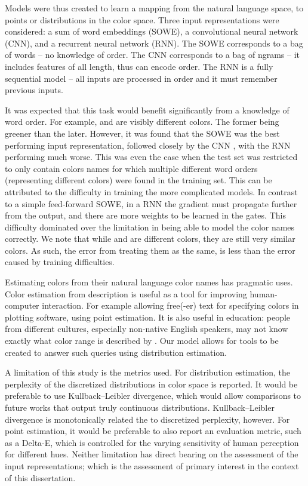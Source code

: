 \documentclass{book}
\begin{document}
Models were thus created to learn a mapping from the natural language space, to points or distributions in the color space.
Three input representations were considered: a sum of word embeddings (SOWE), a convolutional neural network (CNN), and a recurrent neural network (RNN).
The SOWE corresponds to a bag of words -- no knowledge of order.
The CNN corresponds to a bag of ngrams -- it includes features of all length, thus can encode order.
The RNN is a fully sequential model -- all inputs are processed in order and it must remember previous inputs.

It was expected that this task would benefit significantly from a knowledge of word order.
For example,  and  are visibly different colors.
The former being greener than the later.
However, it was found that the SOWE was the best performing input representation, 
followed closely by the CNN , with the RNN performing much worse.
This was even the case when the test set was restricted to only contain colors names for which multiple different word orders (representing different colors) were found in the training set.
This can be attributed to the difficulty in training the more complicated models.
In contrast to a simple feed-forward SOWE, in a RNN the gradient must propagate further from the output,
and there are more weights to be learned in the gates.
This difficulty dominated over the limitation in being able to model the color names correctly.
We note that while  and  are different colors, they are still very similar colors.
As such, the error from treating them as the same, is less than the error caused by training difficulties.


Estimating colors from their natural language color names has pragmatic uses.
Color estimation from description is useful as a tool for improving human-computer interaction.
For example allowing free(-er) text for specifying colors in plotting software, using point estimation.
It is also useful in education: people from different cultures, especially non-native English speakers, may not know exactly what color range is described by .
Our model allows for tools to be created to answer such queries using distribution estimation.


A limitation of this study is the metrics used.
For distribution estimation, the perplexity of the discretized distributions in color space is reported.
It would be preferable to use Kullback–Leibler divergence, which would allow comparisons to future works that output truly continuous distributions.
Kullback–Leibler divergence is monotonically related the to discretized perplexity, however.
For point estimation, it would be preferable to also report an evaluation metric, such as a Delta-E, which is controlled for the varying sensitivity of human perception for different hues.
Neither limitation has direct bearing on the assessment of the input representations; which is the assessment of primary interest in the context of this dissertation.
\end{document}
